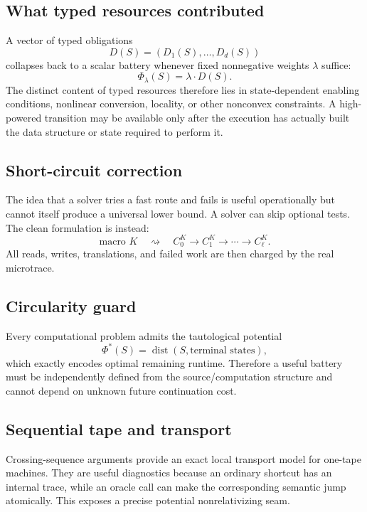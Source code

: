 \documentclass[11pt]{article}
\begin{document}
\subsection{What typed resources contributed}

A vector of typed obligations
\[
D(S)=(D_1(S),\ldots,D_d(S))
\]
collapses back to a scalar battery whenever fixed nonnegative weights
\(\lambda\) suffice:
\[
\Phi_\lambda(S)=\lambda\cdot D(S).
\]
The distinct content of typed resources therefore lies in state-dependent enabling conditions,
nonlinear conversion, locality, or other nonconvex constraints. A high-powered transition may be
available only after the execution has actually built the data structure or state required to perform
it.

\subsection{Short-circuit correction}

The idea that a solver tries a fast route and fails is useful operationally but cannot itself produce
a universal lower bound. A solver can skip optional tests. The clean formulation is instead:
\[
\text{macro }K
\quad\rightsquigarrow\quad
C_0^K\to C_1^K\to\cdots\to C_\ell^K.
\]
All reads, writes, translations, and failed work are then charged by the real microtrace.

\subsection{Circularity guard}

Every computational problem admits the tautological potential
\[
\Phi^*(S)=\operatorname{dist}(S,\text{terminal states}),
\]
which exactly encodes optimal remaining runtime. Therefore a useful battery must be independently
defined from the source/computation structure and cannot depend on unknown future continuation cost.

\subsection{Sequential tape and transport}

Crossing-sequence arguments provide an exact local transport model for one-tape machines. They are
useful diagnostics because an ordinary shortcut has an internal trace, while an oracle call can make
the corresponding semantic jump atomically. This exposes a precise potential nonrelativizing seam.
\end{document}
